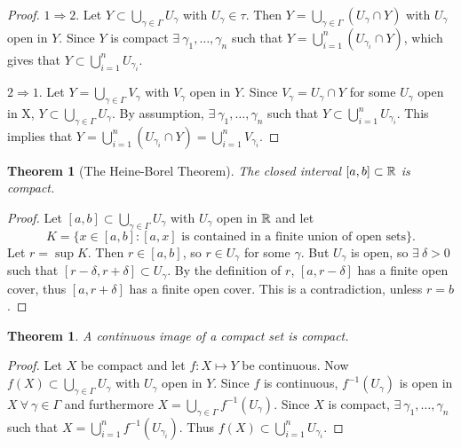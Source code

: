 \documentclass{notes}
\theoremstyle{plain}
\newtheorem{theorem}[proposition]{Theorem}
\begin{document}
\begin{proof}
$1 \Rightarrow 2$.  Let $Y \subset \bigcup_{\gamma \in \Gamma} U_\gamma$ with
$U_\gamma \in \tau$.  Then $Y = \bigcup_{\gamma \in \Gamma} (U_\gamma \cap Y)$
with $U_\gamma$ open in $Y$.  Since $Y$ is compact $\exists\ \gamma_1, \dots
, \gamma_n$ such that $Y = \bigcup_{i=1}^n (U_{\gamma_i}\cap Y)$, which gives
that $Y \subset \bigcup_{i=1}^n U_{\gamma_i}$.

$2 \Rightarrow 1$.  Let $Y = \bigcup_{\gamma \in \Gamma} V_\gamma$ with
$V_\gamma$ open in $Y$.  Since $V_\gamma = U_\gamma \cap Y$ for some $U_\gamma$
open in X, $Y \subset \bigcup_{\gamma \in \Gamma}U_\gamma$.  By assumption,
$\exists\ \gamma_1, \dots, \gamma_n$ such that
$Y \subset \bigcup_{i=1}^{n}U_{\gamma_i}$.  This implies that
$Y = \bigcup_{i=1}^n (U_{\gamma_i}\cap Y) = \bigcup_{i=1}^n V_{\gamma_i}$.
\end{proof}

\begin{theorem}[The Heine-Borel Theorem]
The closed interval $[a,b] \subset \mathbb{R}$ is compact.
\end{theorem}

\begin{proof}
Let $[a,b] \subset \bigcup_{\gamma \in \Gamma} U_\gamma$ with $U_\gamma$ open
in $\mathbb{R}$ and let
\[
K = \{ x \in [a,b] : [a,x] \text{ is contained in a finite
union of open sets}\}.
\]
Let $r = \sup K$. Then $r \in [a,b]$, so $r \in U_\gamma$ for some $\gamma$.
But $U_\gamma$ is open, so $\exists\ \delta >0$ such that
$[r-\delta,r+\delta] \subset U_\gamma$.  By the definition of $r$,
$[a,r-\delta]$ has a finite open cover, thus $[a,r+\delta]$ has a finite
open cover.  This is a contradiction, unless $r = b$.
\end{proof}

\begin{theorem}
A continuous image of a compact set is compact.
\end{theorem}

\begin{proof}
Let $X$ be compact and let $f \colon X \mapsto Y$ be continuous.  Now
$f(X) \subset \bigcup_{\gamma \in \Gamma} U_\gamma$ with $U_\gamma$ open in
$Y$.  Since $f$ is continuous, $f^{-1}(U_\gamma)$ is open in $X\ \forall\ 
\gamma \in \Gamma$ and furthermore $X = \bigcup_{\gamma \in \Gamma} f^{-1}
(U_\gamma)$.  Since $X$ is compact, $\exists\ \gamma_1, \dots, \gamma_n$
such that $X = \bigcup_{i=1}^n f^{-1}(U_{\gamma_i})$.  Thus $f(X) \subset
\bigcup_{i=1}^n U_{\gamma_i}$.
\end{proof}
\end{document}
